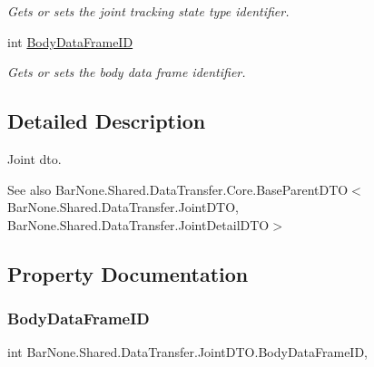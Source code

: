 \begin{DoxyCompactItemize}
\begin{DoxyCompactList}\small\item\em Gets or sets the joint tracking state type identifier. \end{DoxyCompactList}\item 
int \mbox{\hyperlink{class_bar_none_1_1_shared_1_1_data_transfer_1_1_joint_d_t_o_a4e97a164ebd4c9ec44ccb276754471d3}{Body\+Data\+Frame\+ID}}
\begin{DoxyCompactList}\small\item\em Gets or sets the body data frame identifier. \end{DoxyCompactList}\end{DoxyCompactItemize}


\subsection{Detailed Description}
Joint dto. 

\begin{DoxySeeAlso}{See also}
Bar\+None.\+Shared.\+Data\+Transfer.\+Core.\+Base\+Parent\+D\+T\+O$<$\+Bar\+None.\+Shared.\+Data\+Transfer.\+Joint\+D\+T\+O, Bar\+None.\+Shared.\+Data\+Transfer.\+Joint\+Detail\+D\+T\+O$>$


\end{DoxySeeAlso}


\subsection{Property Documentation}
\mbox{\label{class_bar_none_1_1_shared_1_1_data_transfer_1_1_joint_d_t_o_a4e97a164ebd4c9ec44ccb276754471d3}} 
\subsubsection{\texorpdfstring{Body\+Data\+Frame\+ID}{BodyDataFrameID}}
{\footnotesize\ttfamily int Bar\+None.\+Shared.\+Data\+Transfer.\+Joint\+D\+T\+O.\+Body\+Data\+Frame\+ID\hspace{0.3cm}{\ttfamily [get]}, {\ttfamily [set]}}



